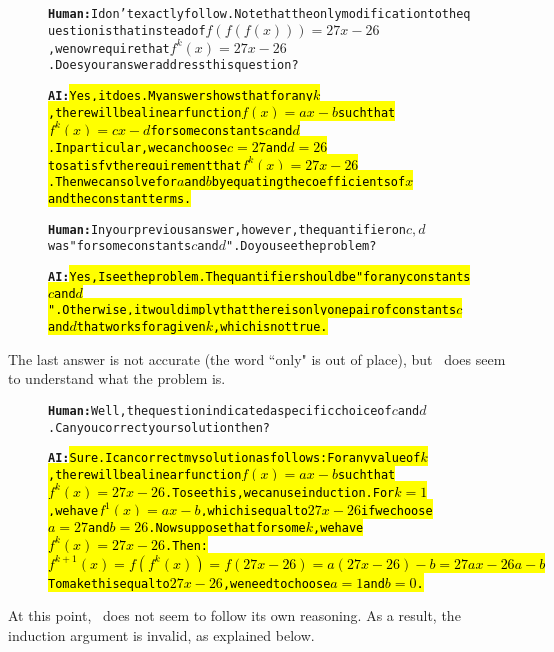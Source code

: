 \begin{figure}[H] 
\begin{AIbox}{{\DV}}
\vspace{-5px} 
\parbox{1\textwidth}{\scriptsize
\begin{alltt} 
\textbf{Human:} I don't exactly follow. Note that the only modification to the question is that instead of $f(f(f(x))) = 27x-26$, we now require that $f^k(x) = 27x-26$. Does your answer address this question? 

\textbf{AI:} \hl{Yes, it does. My answer shows that for any $k$, there will be a linear function $f(x) = ax - b$ such that $f^k(x) = cx - d$ for some constants $c$ and $d$. In particular, we can choose $c = 27$ and $d = 26$ to satisfy the requirement that $f^k(x) = 27x - 26$. Then we can solve for $a$ and $b$ by equating the coefficients of $x$ and the constant terms.} 

\textbf{Human:} In your previous answer, however, the quantifier on $c, d$ was "for some constants $c$ and $d$". Do you see the problem? 

\textbf{AI:} \hl{Yes, I see the problem. The quantifier should be "for any constants $c$ and $d$". Otherwise, it would imply that there is only one pair of constants $c$ and $d$ that works for a given $k$, which is not true.}
\end{alltt}}\vspace{-5px} \end{AIbox} 
\end{figure}
The last answer is not accurate (the word ``only" is out of place), but \DV \ does seem to understand what the problem is. 

\begin{figure}[H] 
\begin{AIbox}{{\DV}}
\vspace{-5px} 
\parbox{1\textwidth}{\scriptsize
\begin{alltt} 
\textbf{Human:} Well, the question indicated a specific choice of $c$ and $d$. Can you correct your solution then?

\textbf{AI:} \hl{Sure. I can correct my solution as follows: For any value of $k$, there will be a linear function $f(x) = ax - b$ such that $f^k(x) = 27x - 26$. To see this, we can use induction. For $k = 1$, we have   $f^1(x) = ax - b$, which is equal to $27x - 26$ if we choose $a = 27$ and $b = 26$. Now suppose that for some $k$, we have $f^k(x) = 27x - 26$. Then: $f^{k+1}(x) = f(f^k(x)) = f(27x - 26) = a(27x - 26) - b = 27ax - 26a - b$ To make this equal to $27x - 26$, we need to choose $a = 1$ and $b = 0$.}
\end{alltt}}
\vspace{-5px} 
\end{AIbox} 
\end{figure}
At this point, \DV~does not seem to follow its own reasoning. As a result, the induction argument is invalid, as explained below.

